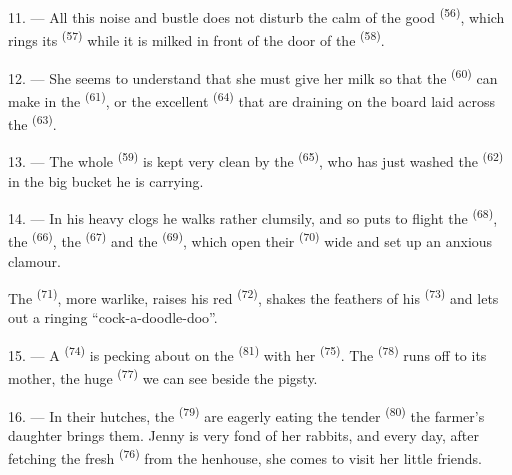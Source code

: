 11. --- All this noise and bustle does not disturb the calm of the good
 \textsuperscript{(56)}, which rings its 
\textsuperscript{(57)} while it is milked in front of the door of the
 \textsuperscript{(58)}.

12. --- She seems to understand that she must give her milk so that the
 \textsuperscript{(60)} can make  in the
 \textsuperscript{(61)}, or the excellent 
\textsuperscript{(64)} that are draining on the board laid across the 
\textsuperscript{(63)}.

13. --- The whole  \textsuperscript{(59)} is kept very clean by the
 \textsuperscript{(65)}, who has just washed the 
\textsuperscript{(62)} in the big bucket he is carrying.

\VUsaut{3.0mm}
\VUsaut{3.0mm}

14. --- In his heavy clogs he walks rather clumsily, and so puts to flight the 
\textsuperscript{(68)}, the  \textsuperscript{(66)}, the
 \textsuperscript{(67)} and the  \textsuperscript{(69)}, which
open their  \textsuperscript{(70)} wide and set up an anxious clamour.

The  \textsuperscript{(71)}, more warlike, raises his red
 \textsuperscript{(72)}, shakes the feathers of his 
\textsuperscript{(73)} and lets out a ringing “cock-a-doodle-doo”.

15. --- A  \textsuperscript{(74)} is pecking about on the
 \textsuperscript{(81)} with her  \textsuperscript{(75)}.
The  \textsuperscript{(78)} runs off to its mother, the huge
 \textsuperscript{(77)} we can see beside the pigsty.

16. --- In their hutches, the  \textsuperscript{(79)} are eagerly eating the
tender  \textsuperscript{(80)} the farmer's daughter brings them. Jenny is very
fond of her rabbits, and every day, after fetching the fresh 
\textsuperscript{(76)} from the henhouse, she comes to visit her little friends.
\VUsaut{6.0mm}
\VUfilet{22mm}
